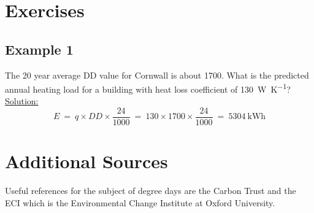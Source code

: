 \documentclass{article}
\begin{document}
\section{Exercises}
\subsection{Example 1}


The 20 year average DD value for Cornwall is about 1700. What is the predicted annual heating load for a building with heat loss coefficient of \SI{130}{\watt\per\kelvin}?\\
 
\underline{Solution:} $$E\ =\ q\times DD\times\frac{24}{1000}\ =\ 130\times 1700\times \frac{24}{1000}\ =\ 5304\ \text{kWh}$$


\section{Additional Sources}

Useful references for the subject of degree days are the Carbon Trust \cite{CarbonTrust2012} and the ECI \cite{ECIOxfordUniversity2014} which is the Environmental Change Institute at Oxford University.

 

 \printbibliography

 
\end{document}

